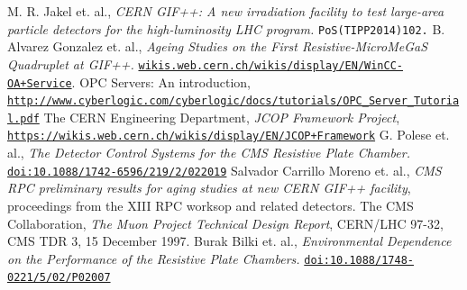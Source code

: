 \documentclass[a4paper,11pt]{article}
\begin{document}
\begin{thebibliography}{99}
 M. R. Jakel et. al., \emph{CERN GIF++: A new irradiation facility to test large-area particle detectors for the high-luminosity LHC program.}
\texttt{PoS(TIPP2014)102.} 
 B. Alvarez Gonzalez et. al., \emph{Ageing Studies on the First Resistive-MicroMeGaS Quadruplet at GIF++.}
 \href{https://wikis.web.cern.ch/wikis/display/EN/WinCC-OA+Service}{\texttt{wikis.web.cern.ch/wikis/display/EN/WinCC-OA+Service}}.
OPC Servers: An introduction,
\href{http://www.cyberlogic.com/cyberlogic/docs/tutorials/OPC\_Server\_Tutorial.pdf}{\texttt{http://www.cyberlogic.com/cyberlogic/docs/tutorials/OPC\_Server\_Tutorial.pdf}}
The CERN Engineering Department, \emph{JCOP Framework Project},
\href{https://wikis.web.cern.ch/wikis/display/EN/JCOP+Framework}{\texttt{https://wikis.web.cern.ch/wikis/display/EN/JCOP+Framework}}
G. Polese et. al., \emph{The Detector Control Systems for the CMS Resistive Plate Chamber.}
\href{http://iopscience.iop.org/article/10.1088/1742-6596/219/2/022019/pdf}{\texttt{doi:10.1088/1742-6596/219/2/022019}}
Salvador Carrillo Moreno et. al., \emph{CMS RPC preliminary results for aging studies at new CERN GIF++ facility}, proceedings from the XIII RPC worksop and related detectors.
The CMS Collaboration, \emph{The Muon Project Technical Design Report}, CERN/LHC 97-32, CMS TDR 3, 15 December 1997.
Burak Bilki et. al., \emph{Environmental Dependence on the Performance of the Resistive Plate Chambers.}
\href{http://iopscience.iop.org/article/10.1088/1748-0221/5/02/P02007/pdf}{\texttt{doi:10.1088/1748-0221/5/02/P02007}}

\end{thebibliography}
\end{document}
